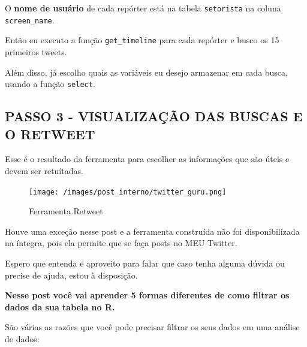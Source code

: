 \documentclass[
]{book}
\newenvironment{Shaded}{\begin{snugshade}}{\end{snugshade}}
\newcommand{\ControlFlowTok}[1]{\textcolor[rgb]{0.13,0.29,0.53}{\textbf{#1}}}
\newcommand{\DataTypeTok}[1]{\textcolor[rgb]{0.13,0.29,0.53}{#1}}
\newcommand{\DecValTok}[1]{\textcolor[rgb]{0.00,0.00,0.81}{#1}}
\newcommand{\KeywordTok}[1]{\textcolor[rgb]{0.13,0.29,0.53}{\textbf{#1}}}
\newcommand{\NormalTok}[1]{#1}
\newcommand{\OperatorTok}[1]{\textcolor[rgb]{0.81,0.36,0.00}{\textbf{#1}}}
\newcommand{\StringTok}[1]{\textcolor[rgb]{0.31,0.60,0.02}{#1}}
\begin{document}
O \textbf{nome de usuário} de cada repórter está na tabela
\texttt{setorista} na coluna \texttt{screen\_name}.

Então eu executo a função \texttt{get\_timeline} para cada repórter e
busco os 15 primeiros tweets.

Além disso, já escolho quais as variáveis eu desejo armazenar em cada
busca, usando a função \texttt{select}.

\begin{Shaded}
\end{Shaded}

\hypertarget{passo-3---visualizauxe7uxe3o-das-buscas-e-o-retweet}{%
\subsection{PASSO 3 - VISUALIZAÇÃO DAS BUSCAS E O
RETWEET}\label{passo-3---visualizauxe7uxe3o-das-buscas-e-o-retweet}}

Esse é o resultado da ferramenta para escolher as informações que são
úteis e devem ser retuítadas.

\begin{figure}
\centering
\texttt{[image: /images/post\_interno/twitter\_guru.png]}
\caption{Ferramenta Retweet}
\end{figure}

Houve uma exceção nesse post e a ferramenta construída não foi
disponibilizada na íntegra, pois ela permite que se faça posts no MEU
Twitter.

Espero que entenda e aproveito para falar que caso tenha alguma dúvida
ou precise de ajuda, estou à disposição.

\textbf{Nesse post você vai aprender 5 formas diferentes de como filtrar
os dados da sua tabela no R.}

São várias as razões que você pode precisar filtrar os seus dados em uma
análise de dados:
\end{document}
